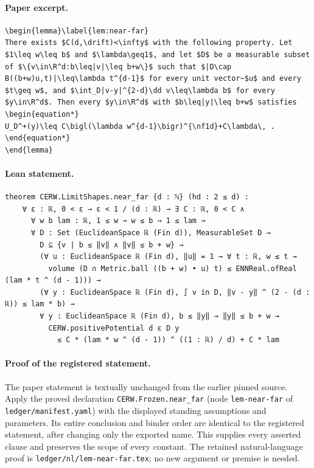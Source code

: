 \paragraph{Paper excerpt.}
\begin{verbatim}
\begin{lemma}\label{lem:near-far}
There exists $C(d,\drift)<\infty$ with the following property. Let $1\leq w\leq b$ and $\lambda\geq1$, and let $D$ be a measurable subset of $\{v\in\R^d:b\leq|v|\leq b+w\}$ such that $|D\cap B((b+w)u,t)|\leq\lambda t^{d-1}$ for every unit vector~$u$ and every $t\geq w$, and $\int_D|v-y|^{2-d}\dd v\leq\lambda b$ for every $y\in\R^d$. Then every $y\in\R^d$ with $b\leq|y|\leq b+w$ satisfies
\begin{equation*}
U_D^+(y)\leq C\bigl(\lambda w^{d-1}\bigr)^{\nf1d}+C\lambda\, .
\end{equation*}
\end{lemma}
\end{verbatim}
\paragraph{Lean statement.}
\begin{verbatim}
theorem CERW.LimitShapes.near_far {d : ℕ} (hd : 2 ≤ d) :
    ∀ ε : ℝ, 0 < ε → ε < 1 / (d : ℝ) → ∃ C : ℝ, 0 < C ∧
      ∀ w b lam : ℝ, 1 ≤ w → w ≤ b → 1 ≤ lam →
      ∀ D : Set (EuclideanSpace ℝ (Fin d)), MeasurableSet D →
        D ⊆ {v | b ≤ ‖v‖ ∧ ‖v‖ ≤ b + w} →
        (∀ u : EuclideanSpace ℝ (Fin d), ‖u‖ = 1 → ∀ t : ℝ, w ≤ t →
          volume (D ∩ Metric.ball ((b + w) • u) t) ≤ ENNReal.ofReal (lam * t ^ (d - 1))) →
        (∀ y : EuclideanSpace ℝ (Fin d), ∫ v in D, ‖v - y‖ ^ (2 - (d : ℝ)) ≤ lam * b) →
        ∀ y : EuclideanSpace ℝ (Fin d), b ≤ ‖y‖ → ‖y‖ ≤ b + w →
          CERW.positivePotential d ε D y
            ≤ C * (lam * w ^ (d - 1)) ^ ((1 : ℝ) / d) + C * lam
\end{verbatim}
\paragraph{Proof of the registered statement.}
The paper statement is textually unchanged from the earlier pinned source.
Apply the proved declaration \texttt{CERW.Frozen.near\_far}
(node \texttt{lem-near-far} of \texttt{ledger/manifest.yaml}) with the displayed
standing assumptions and parameters. Its entire conclusion and binder order
are identical to the registered statement, after changing only the exported
name. This supplies every asserted clause and preserves the scope of every
constant. The retained natural-language proof is
\texttt{ledger/nl/lem-near-far.tex}; no new argument or premise is needed.
